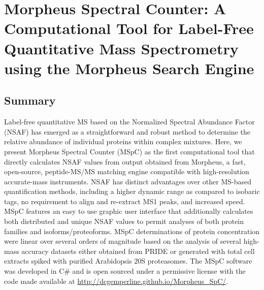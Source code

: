 \chapter{Morpheus Spectral Counter: A Computational Tool for Label-Free Quantitative Mass Spectrometry using the Morpheus Search Engine}

\section{Summary}
Label-free quantitative MS based on the Normalized Spectral Abundance Factor (NSAF) has emerged as a straightforward and robust method to determine the relative abundance of individual proteins within complex mixtures.
Here, we present Morpheus Spectral Counter (MSpC) as the first computational tool that directly calculates NSAF values from output obtained from Morpheus, a fast, open-source, peptide-MS/MS matching engine compatible with high-resolution accurate-mass instruments.
NSAF has distinct advantages over other MS-based quantification methods, including a higher dynamic range as compared to isobaric tags, no requirement to align and re-extract MS1 peaks, and increased speed.
MSpC features an easy to use graphic user interface that additionally calculates both distributed and unique NSAF values to permit analyses of both protein families and isoforms/proteoforms.
MSpC determinations of protein concentration were linear over several orders of magnitude based on the analysis of several high-mass accuracy datasets either obtained from PRIDE or generated with total cell extracts spiked with purified Arabidopsis 20S proteasomes.
The MSpC software was developed in C\# and is open sourced under a permissive license with the code made available at \url{http://dcgemperline.github.io/Morpheus_SpC/}. 

